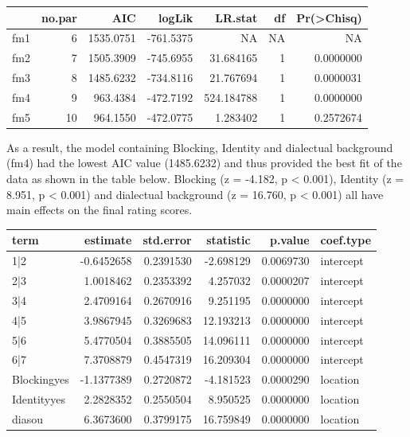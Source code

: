 \documentclass[
  english,
  man,floatsintext]{apa6}
\begin{document}
\begin{tabular}{l|r|r|r|r|r|r}
\hline
  & no.par & AIC & logLik & LR.stat & df & Pr(>Chisq)\\
\hline
fm1 & 6 & 1535.0751 & -761.5375 & NA & NA & NA\\
\hline
fm2 & 7 & 1505.3909 & -745.6955 & 31.684165 & 1 & 0.0000000\\
\hline
fm3 & 8 & 1485.6232 & -734.8116 & 21.767694 & 1 & 0.0000031\\
\hline
fm4 & 9 & 963.4384 & -472.7192 & 524.184788 & 1 & 0.0000000\\
\hline
fm5 & 10 & 964.1550 & -472.0775 & 1.283402 & 1 & 0.2572674\\
\hline
\end{tabular}

As a result, the model containing Blocking, Identity and dialectual background (fm4) had the lowest AIC value (1485.6232) and thus provided the best fit of the data as shown in the table below. Blocking (z = -4.182, p \textless{} 0.001), Identity (z = 8.951, p \textless{} 0.001) and dialectual background (z = 16.760, p \textless{} 0.001) all have main effects on the final rating scores.

\begin{tabular}{l|r|r|r|r|l}
\hline
term & estimate & std.error & statistic & p.value & coef.type\\
\hline
1|2 & -0.6452658 & 0.2391530 & -2.698129 & 0.0069730 & intercept\\
\hline
2|3 & 1.0018462 & 0.2353392 & 4.257032 & 0.0000207 & intercept\\
\hline
3|4 & 2.4709164 & 0.2670916 & 9.251195 & 0.0000000 & intercept\\
\hline
4|5 & 3.9867945 & 0.3269683 & 12.193213 & 0.0000000 & intercept\\
\hline
5|6 & 5.4770504 & 0.3885505 & 14.096111 & 0.0000000 & intercept\\
\hline
6|7 & 7.3708879 & 0.4547319 & 16.209304 & 0.0000000 & intercept\\
\hline
Blockingyes & -1.1377389 & 0.2720872 & -4.181523 & 0.0000290 & location\\
\hline
Identityyes & 2.2828352 & 0.2550504 & 8.950525 & 0.0000000 & location\\
\hline
diasou & 6.3673600 & 0.3799175 & 16.759849 & 0.0000000 & location\\
\hline
\end{tabular}

\newpage
\end{document}
